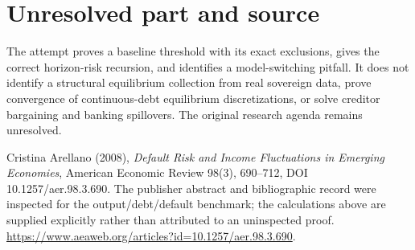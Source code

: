 \documentclass[11pt]{article}
\begin{document}
\section*{Unresolved part and source}
The attempt proves a baseline threshold with its exact exclusions, gives the correct horizon-risk recursion, and identifies a model-switching pitfall. It does not identify a structural equilibrium collection from real sovereign data, prove convergence of continuous-debt equilibrium discretizations, or solve creditor bargaining and banking spillovers. The original research agenda remains unresolved.

Cristina Arellano (2008), \emph{Default Risk and Income Fluctuations in Emerging Economies}, American Economic Review 98(3), 690--712, DOI 10.1257/aer.98.3.690. The publisher abstract and bibliographic record were inspected for the output/debt/default benchmark; the calculations above are supplied explicitly rather than attributed to an uninspected proof. \url{https://www.aeaweb.org/articles?id=10.1257/aer.98.3.690}.
\end{document}
